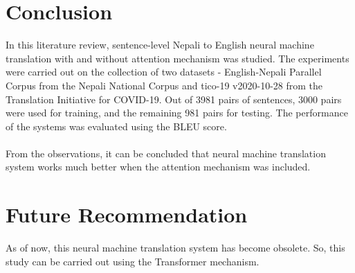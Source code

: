 \section{Conclusion}
In this literature review, sentence-level Nepali to English neural machine translation with and without attention mechanism was studied. The experiments were carried out on the collection of two datasets - English-Nepali Parallel Corpus from the Nepali National Corpus and tico-19 v2020-10-28 from the Translation Initiative for COVID-19. Out of 3981 pairs of sentences, 3000 pairs were used for training, and the remaining 981 pairs for testing. The performance of the systems was evaluated using the BLEU score.
\\\\
From the observations, it can be concluded that neural machine translation system works much better when the attention mechanism was included.

\section{Future Recommendation}
As of now, this neural machine translation system has become obsolete. So, this study can be carried out using the Transformer mechanism.